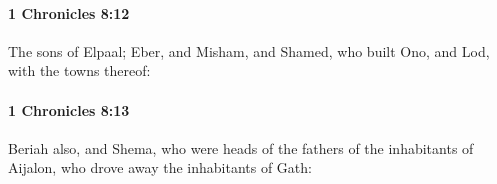		\paragraph{1 Chronicles 8:12} %
			\label{1CHRONICLES-8-12}

			The sons of Elpaal; Eber, and Misham, and Shamed, who built Ono, and Lod, with the towns thereof:


		\paragraph{1 Chronicles 8:13} %
			\label{1CHRONICLES-8-13}

			Beriah also, and Shema, who were heads of the fathers of the inhabitants of Aijalon, who drove away the inhabitants of Gath:


